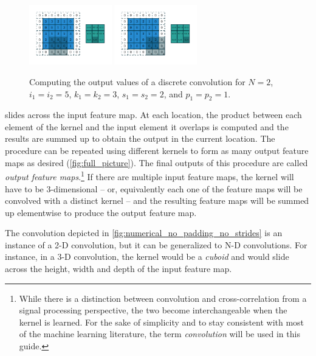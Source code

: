 \begin{figure}[p]
    \includegraphics[width=0.32\textwidth]{pdf/numerical_padding_strides_07.pdf}
    \includegraphics[width=0.32\textwidth]{pdf/numerical_padding_strides_08.pdf}
    \caption{\label{fig:numerical_padding_strides} Computing the output values
        of a discrete convolution for $N = 2$, $i_1 = i_2 = 5$, $k_1 = k_2 = 3$,
        $s_1 = s_2 = 2$, and $p_1 = p_2 = 1$.}
\end{figure}

\noindent slides across the input feature map. At each location, the product
between each element of the kernel and the input element it overlaps is computed
and the results are summed up to obtain the output in the current location. The
procedure can be repeated using different kernels to form as many output feature
maps as desired (\autoref{fig:full_picture}). The final outputs of this procedure
are called {\em output feature maps}.\footnote{%
    While there is a distinction between convolution and cross-correlation from
    a signal processing perspective, the two become interchangeable when the
    kernel is learned. For the sake of simplicity and to stay consistent with
    most of the machine learning literature, the term {\em convolution\/}
    will be used in this guide.}
If there are multiple input feature maps, the kernel will have to be
3-dimensional -- or, equivalently each one of the feature maps will be
convolved with a distinct kernel -- and the resulting feature maps will
be summed up elementwise to produce the output feature map.

The convolution depicted in \autoref{fig:numerical_no_padding_no_strides} is an
instance of a 2-D convolution, but it can be generalized to N-D convolutions.
For instance, in a 3-D convolution, the kernel would be a {\em cuboid\/} and
would slide across the height, width and depth of the input feature map.

